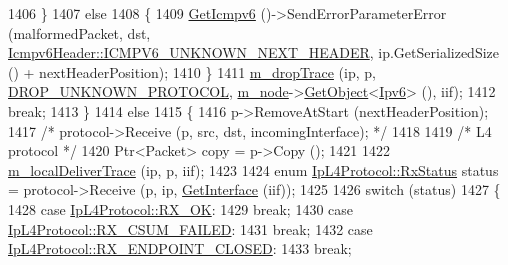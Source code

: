 \begin{DoxyCode}
1406                 \}
1407               \textcolor{keywordflow}{else}
1408                 \{
1409                   \hyperlink{classns3_1_1Ipv6L3Protocol_a10384a4dc85c61e65cf73b47ec9da90d}{GetIcmpv6} ()->SendErrorParameterError (malformedPacket, dst, 
      \hyperlink{classns3_1_1Icmpv6Header_ae9230cd167393f553a3c2ded106858caa0eae2e0ddc20524b6a988de9631096c6}{Icmpv6Header::ICMPV6\_UNKNOWN\_NEXT\_HEADER}, ip.GetSerializedSize () +
       nextHeaderPosition);
1410                 \}
1411               \hyperlink{classns3_1_1Ipv6L3Protocol_ac22d2d63cac436267ae6cafc46880a6e}{m\_dropTrace} (ip, p, \hyperlink{classns3_1_1Ipv6L3Protocol_a33c64db9bc35f71ff368b132bfffa37aaaf932a981ea33f927add80ea8ed41b05}{DROP\_UNKNOWN\_PROTOCOL}, 
      \hyperlink{classns3_1_1Ipv6L3Protocol_a543d8509395ee76de15d039ff1fce642}{m\_node}->\hyperlink{classns3_1_1Object_a13e18c00017096c8381eb651d5bd0783}{GetObject}<\hyperlink{classns3_1_1Ipv6_adccc58acd14d3f9a28f75dc09e794998}{Ipv6}> (), iif);
1412               \textcolor{keywordflow}{break};
1413             \}
1414           \textcolor{keywordflow}{else}
1415             \{
1416               p->RemoveAtStart (nextHeaderPosition);
1417               \textcolor{comment}{/* protocol->Receive (p, src, dst, incomingInterface); */}
1418 
1419               \textcolor{comment}{/* L4 protocol */}
1420               Ptr<Packet> copy = p->Copy ();
1421 
1422               \hyperlink{classns3_1_1Ipv6L3Protocol_afd8b2aef3c54456b509cdc7356db577e}{m\_localDeliverTrace} (ip, p, iif);
1423 
1424               \textcolor{keyword}{enum} \hyperlink{classns3_1_1IpL4Protocol_afd3744c89902fff232e2fd45f558c80e}{IpL4Protocol::RxStatus} status = protocol->Receive (p, ip, 
      \hyperlink{classns3_1_1Ipv6L3Protocol_a2e53b72d76bceb713f2d3cb54e24f5a1}{GetInterface} (iif));
1425 
1426               \textcolor{keywordflow}{switch} (status)
1427                 \{
1428                 \textcolor{keywordflow}{case} \hyperlink{classns3_1_1IpL4Protocol_afd3744c89902fff232e2fd45f558c80eabd979bce2f3b22521c81c4115c66317e}{IpL4Protocol::RX\_OK}:
1429                   \textcolor{keywordflow}{break};
1430                 \textcolor{keywordflow}{case} \hyperlink{classns3_1_1IpL4Protocol_afd3744c89902fff232e2fd45f558c80eaba0111c02656760e18ca30479e297b07}{IpL4Protocol::RX\_CSUM\_FAILED}:
1431                   \textcolor{keywordflow}{break};
1432                 \textcolor{keywordflow}{case} \hyperlink{classns3_1_1IpL4Protocol_afd3744c89902fff232e2fd45f558c80eac7f4577d3ab1a219d6cb2b6964c49afd}{IpL4Protocol::RX\_ENDPOINT\_CLOSED}:
1433                   \textcolor{keywordflow}{break};

\end{DoxyCode}
